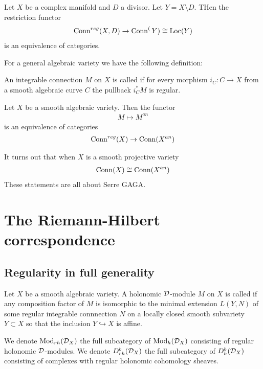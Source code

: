 \begin{theorem}
    [Deligne] Let $X$ be a complex manifold and $D$ a divisor. Let $Y = X\setminus D$. THen 
    the restriction functor \begin{align*}
        \operatorname{Conn}^{reg}(X,D) \to \operatorname{Conn}^(Y) \cong \operatorname{Loc}(Y)
    \end{align*} is an equivalence of categories.
\end{theorem}

For a general algebraic variety we have the following definition:
\begin{definition}
    An integrable connection $M$ on $X$ is called  if for every morphism 
    $i_C:C\to X$ from a smooth algebraic curve $C$ the pullback $i_C^*M$ is regular.
\end{definition}

\begin{theorem}
    [Deligne] Let $X$ be a smooth algebraic variety. Then the functor \begin{align*}
        M \mapsto M^{an}
    \end{align*} is an equivalence of categories \begin{align*}
        \operatorname{Conn}^{reg}(X) \to \operatorname{Conn}(X^{an})
    \end{align*}
\end{theorem}
It turns out that when $X$ is a smooth projective variety \begin{align*}
    \operatorname{Conn}(X) \cong \operatorname{Conn}(X^{an})
\end{align*}
These statements are all about Serre GAGA.

\section{The Riemann-Hilbert correspondence}
\subsection{Regularity in full generality}
\begin{definition}
    Let $X$ be a smooth algebraic variety. A holonomic ${\mathcal{D}}$-module $M$ on $X$ is called
     if any composition factor of $M$ is isomorphic to the 
    minimal extension $L(Y,N)$ of some regular integrable connnection $N$ 
    on a locally closed smooth subvariety $Y\subset X$ so that the inclusion 
    $Y\hookrightarrow X$ is affine.

    \hfill

    We denote $\operatorname{Mod}_{rh}({\mathcal{D}}_X)$ the full subcategory of $\operatorname{Mod}_h({\mathcal{D}}_X)$
    consisting of regular holonomic ${\mathcal{D}}$-modules. We denote $D^b_{rh}({\mathcal{D}}_X)$
    the full subcategory of $D^b_h({\mathcal{D}}_X)$ consisting of complexes with regular
    holonomic cohomology sheaves.
\end{definition}


